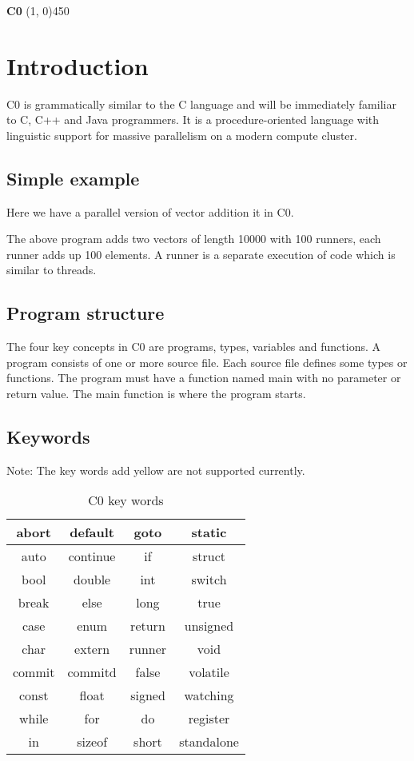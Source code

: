\documentclass[a4paper]{article}
\begin{document}
\begin{flushleft}
\Large \textbf{C0}
\line(1, 0){450}
\end{flushleft}

\section{Introduction}
C0 is grammatically similar to the C language and will be immediately familiar to C, C++ and Java programmers. It is a procedure-oriented language with linguistic support for massive parallelism on a modern compute cluster. 

\subsection{Simple example}
Here we have a parallel version of vector addition it in C0.

The above program adds two vectors of length 10000 with 100 runners, each runner adds up 100 elements. A runner is a separate execution of code which is similar to threads.

\subsection{Program structure}
The four key concepts in C0 are programs, types, variables and functions. A program consists of one or more source file. Each source file defines some types or functions. The program must have a function named main with no parameter or return value. The main function is where the program starts.

\subsection{Keywords}
Note: The key words add yellow are not supported currently.

\begin{table}[htbp]
\centering
\caption{C0 key words}
\begin{tabular}{|c|c|c|c|}
\hline
abort & default & goto & static\\
\hline
auto & continue & if & struct\\
\hline
bool & double & int & switch\\
\hline
break & else & long & true\\
\hline
case & enum & return & unsigned\\
\hline
char & extern & runner & void\\
\hline
commit & commitd & false & volatile\\
\hline
const & float & signed & watching\\
\hline
while & for & do & register\\
\hline
in & sizeof & short & standalone\\
\hline
\end{tabular}
\label{table:key-words}
\end{table}
\end{document}
